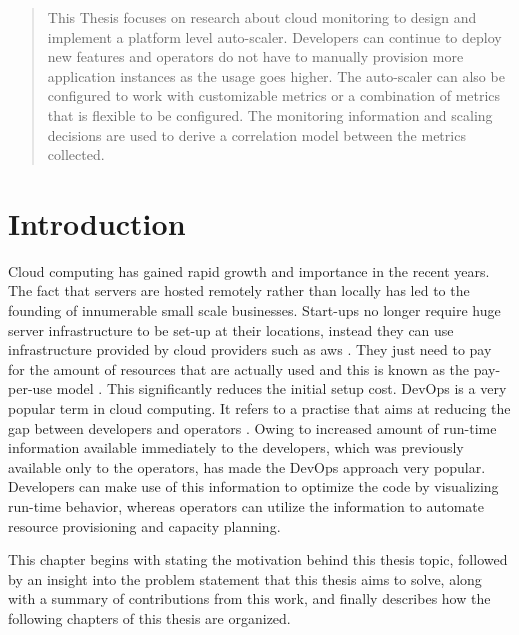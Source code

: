 \documentclass[article,type=msc,colorback,12pt,accentcolor=tud8b,table]{tudthesis}
\begin{document}
\begin{abstract}
	This Thesis focuses on research about cloud monitoring to design and implement a platform level auto-scaler. Developers can continue to deploy new features and operators do not have to manually provision more application instances as the usage goes higher. The auto-scaler can also be configured to work with customizable metrics or a combination of metrics that is flexible to be configured. The monitoring information and scaling decisions are used to derive a correlation model between the metrics collected.
	

\end{abstract}  

\clearpage

\setlength{ \parskip }{1em}
\tableofcontents 
\cleardoublepage 
\listoffigures
\cleardoublepage 
\listoftables
\clearpage
\cleardoublepage 


\hfill
 \section{Introduction}
	 \hfill \break
	
		Cloud computing has gained rapid growth and importance in the recent years. The fact that servers are hosted remotely rather than locally has led to the founding of innumerable small scale businesses. Start-ups no longer require huge server infrastructure to be set-up at their locations, instead they can use infrastructure provided by cloud providers such as \gls{aws} \cite{aws}. They just need to pay for the amount of resources that are actually used and this is known as the pay-per-use model \cite{armbrust2010view}. This significantly reduces the initial setup cost. DevOps is a very popular term in cloud computing. It refers to a practise that aims at reducing the gap between developers and operators \cite{httermann2012devops}. Owing to increased amount of run-time information available immediately to the developers, which was previously available only to the operators, has made the DevOps approach very popular. Developers can make use of this information to optimize the code by visualizing run-time behavior, whereas operators can utilize the information to automate resource provisioning and capacity planning.
		
		
		\par This chapter begins with stating the motivation behind this thesis topic, followed by an insight into the problem statement that this thesis aims to solve, along with a summary of contributions from this work, and finally describes how the following chapters of this thesis are organized.
	
\end{document}
